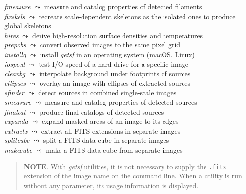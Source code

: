 \documentclass[a4paper,10pt]{article}
\begin{document}
\begin{tabbing}
\textsl{fmeasure}  \> $\leadsto$ measure and catalog properties of detected filaments\\
\textsl{fixskels}  \> $\leadsto$ recreate scale-dependent skeletons as the isolated ones to produce global skeletons\\
\textsl{hires}     \> $\leadsto$ derive high-resolution surface densities and temperatures\\
\textsl{prepobs}   \> $\leadsto$ convert observed images to the same pixel grid\\
\textsl{installg}  \> $\leadsto$ install \textsl{getsf} in an operating system (macOS, Linux)\\
\textsl{iospeed}   \> $\leadsto$ test I/O speed of a hard drive for a specific image\\
\textsl{cleanbg}   \> $\leadsto$ interpolate background under footprints of sources\\
\textsl{ellipses}  \> $\leadsto$ overlay an image with ellipses of extracted sources\\
\textsl{sfinder}   \> $\leadsto$ detect sources in combined single-scale images\\
\textsl{smeasure}  \> $\leadsto$ measure and catalog properties of detected sources\\
\textsl{finalcat}  \> $\leadsto$ produce final catalogs of detected sources\\
\textsl{expanda}   \> $\leadsto$ expand masked areas of an image to its edges\\
\textsl{extractx}  \> $\leadsto$ extract all FITS extensions in separate images\\
\textsl{splitcube} \> $\leadsto$ split a FITS data cube in separate images\\
\textsl{makecube}  \> $\leadsto$ make a FITS data cube from separate images
\end{tabbing} %
\begin{quote} %
\textbf{NOTE}. With \textsl{getsf} utilities, it is not necessary to supply the \verb!.fits! extension of the image name on the
command line. When a utility is run without any parameter, its usage information is displayed.
\end{quote} %
\end{document}
